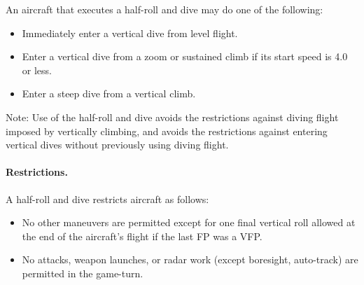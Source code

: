 An aircraft that executes a half-roll and dive may do one of the following:

\begin{itemize}

    \item Immediately enter a vertical dive from level flight.

    \item Enter a vertical dive from a zoom or sustained climb if its start speed is 4.0 or less.

    \item Enter a steep dive from a vertical climb.

\end{itemize}

Note: Use of the half-roll and dive avoids the restrictions against diving flight imposed by vertically climbing, and avoids the restrictions against entering vertical dives without previously using diving flight.    

\paragraph{Restrictions.} A half-roll and dive restricts aircraft as follows:

\begin{itemize}



    \item No other maneuvers are permitted except for one final vertical roll allowed at the end of the aircraft's flight if the last FP was a VFP.

    \item No attacks, weapon launches, or radar work (except boresight, auto-track) are permitted in the game-turn.
    
\end{itemize}

